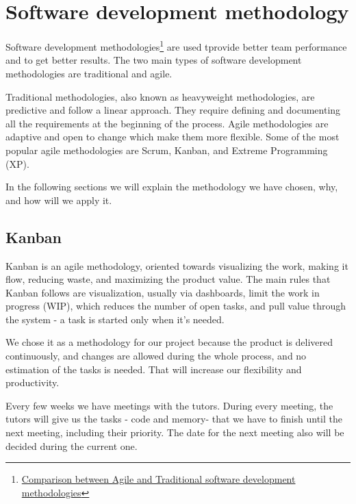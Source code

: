 \chapter{Software development methodology}
\label{Software development methodology}

Software development methodologies\footnote{\href{https://www.researchgate.net/publication/278300889_Comparison_between_Agile_and_Traditional_software_development_methodologies}{Comparison between Agile and Traditional software development methodologies}} are used tprovide better team performance and to get better results. The two main types of software development methodologies are traditional and agile.
 
Traditional methodologies, also known as heavyweight methodologies, are predictive and follow a linear approach. They require defining and documenting all the requirements at the beginning of the process. Agile methodologies are adaptive and open to change which make them more flexible. Some of the most popular agile methodologies are Scrum, Kanban, and Extreme Programming (XP).

In the following sections we will explain the methodology we have chosen, why, and how will we apply it.

\section{Kanban}
Kanban is an agile methodology, oriented towards visualizing the work, making it flow, reducing waste, and maximizing the product value. The main rules that Kanban follows are visualization, usually via dashboards, limit the work in progress (WIP), which reduces the number of open tasks, and pull value through the system - a task is started only when it's needed.

 We chose it as a methodology for our project because the product is delivered continuously, and changes are allowed during the whole process, and no estimation of the tasks is needed. That will increase our flexibility and productivity.


Every few weeks we have meetings with the tutors. During every meeting, the tutors will give us the tasks - code and memory- that we have to finish until the next meeting, including their priority. The date for the next meeting also will be decided during the current one.

